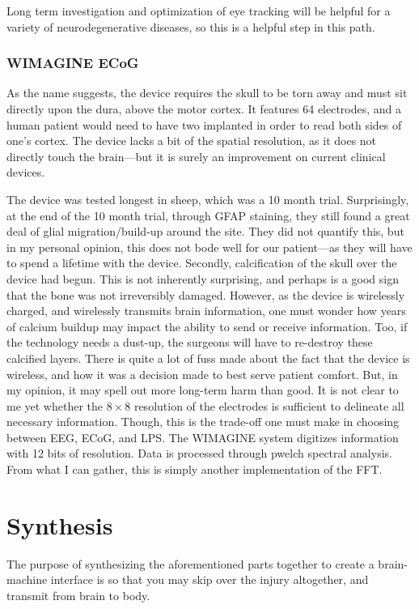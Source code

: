 Long term investigation and optimization of eye tracking will be helpful for a variety of neurodegenerative diseases, so this is a helpful step in this path. 


\subsection{WIMAGINE ECoG}
As the name suggests, the device requires the skull to be torn away and must sit directly upon the dura, above the motor cortex. It features 64 electrodes, and a human patient would need to have two implanted in order to read both sides of one's cortex. The device lacks a bit of the spatial resolution, as it does not directly touch the brain---but it is surely an improvement on current clinical devices.\newline

The device was tested longest in sheep, which was a 10 month trial. Surprisingly, at the end of the 10 month trial, through GFAP staining, they still found a great deal of glial migration/build-up around the site. They did not quantify this, but in my personal opinion, this does not bode well for our patient---as they will have to spend a lifetime with the device. Secondly, calcification of the skull over the device had begun. This is not inherently surprising, and perhaps is a good sign that the bone was not irreversibly damaged. However, as the device is wirelessly charged, and wirelessly transmits brain information, one must wonder how years of calcium buildup may impact the ability to send or receive information. Too, if the technology needs a dust-up, the surgeons will have to re-destroy these calcified layers. There is quite a lot of fuss made about the fact that the device is wireless, and how it was a decision made to best serve patient comfort. But, in my opinion, it may spell out more long-term harm than good. It is not clear to me yet whether the $8\times 8$ resolution of the electrodes is sufficient to delineate all necessary information. Though, this is the trade-off one must make in choosing between EEG, ECoG, and LPS. The WIMAGINE system digitizes information with 12 bits of resolution. Data is processed through pwelch spectral analysis. From what I can gather, this is simply another implementation of the FFT. 


\chapter{Synthesis}

The purpose of synthesizing the aforementioned parts together to create a brain-machine interface is so that you may skip over the injury altogether, and transmit from brain to body. 


